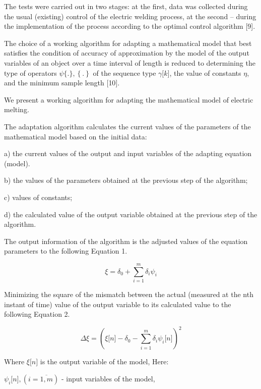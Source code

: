 \begin{multicols}{2}
The tests were carried out in two stages: at the first, data was
collected during the usual (existing) control of the electric welding
process, at the second -- during the implementation of the process
according to the optimal control algorithm {[}9{]}.

The choice of a working algorithm for adapting a mathematical model that
best satisfies the condition of accuracy of approximation by the model
of the output variables of an object over a time interval of length is
reduced to determining the type of operators
\(\psi\{.\},\left\{ . \right\}\) of the sequence type
\(\gamma\lbrack k\rbrack\), the value of constants \(\eta\), and the
minimum sample length {[}10{]}.

We present a working algorithm for adapting the mathematical model of
electric melting.

The adaptation algorithm calculates the current values of the parameters
of the mathematical model based on the initial data:

a) the current values of the output and input variables of the adapting
equation (model).

b) the values of the parameters obtained at the previous step of the
algorithm;

c) values of constants;

d) the calculated value of the output variable obtained at the previous
step of the algorithm.

The output information of the algorithm is the adjusted values of the
equation parameters to the following Equation 1.
\end{multicols}

\begin{equation}
\xi = \delta_{0} + \sum_{i = 1}^{m}\delta_{i}\psi_{i}
\end{equation}

Minimizing the square of the mismatch between the actual (measured at
the nth instant of time) value of the output variable to its calculated
value to the following Equation 2.

\begin{equation}
\Delta\xi = (\xi\lbrack n\rbrack - \delta_{0} - \sum_{i = 1}^{m}{\delta_{i}\psi_{i}}\lbrack n\rbrack)^{2}
\end{equation}

Where \(\xi\lbrack n\rbrack\) is the output variable of the model, Here:

\(\psi_{i}\lbrack n\rbrack,(i = \overline{1,m})\) - input variables of
the model,

